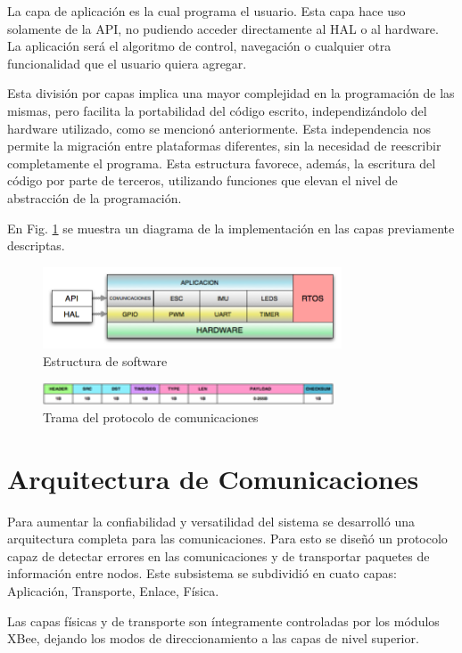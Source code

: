 \documentclass[a4paper, conference]{IEEEtran}
\begin{document}
La capa de aplicación es la cual programa el usuario. Esta capa hace uso solamente de la API, no pudiendo acceder directamente al HAL o al hardware. La aplicación será el algoritmo de control, navegación o cualquier otra funcionalidad que el usuario quiera agregar.

Esta división por capas implica una mayor complejidad en la programación de las mismas, pero facilita la portabilidad del código escrito, independizándolo del hardware utilizado, como se mencionó anteriormente. Esta independencia nos permite la migración entre plataformas diferentes, sin la necesidad de reescribir completamente el programa. Esta estructura favorece, además, la escritura del código por parte de terceros, utilizando funciones que elevan el nivel de abstracción de la programación.

En Fig. \ref{ref:soft} se muestra un diagrama de la implementación en las capas previamente descriptas.

\begin{figure}[!t]
\centering
\includegraphics[width=3.49in]{soft}
\caption{Estructura de software}
\label{ref:soft}
\end{figure}

\begin{figure}[!t]
\centering
\includegraphics[width=3.40in]{trama}
\caption{Trama del protocolo de comunicaciones}
\label{ref:trama}
\end{figure}

\section{Arquitectura de Comunicaciones}

Para aumentar la confiabilidad y versatilidad del sistema se desarrolló una arquitectura completa para las comunicaciones. Para esto se diseñó un protocolo capaz de detectar errores en las comunicaciones y de transportar paquetes de información entre nodos. Este subsistema se subdividió en cuato capas: Aplicación, Transporte, Enlace, Física.

Las capas físicas y de transporte son íntegramente controladas por los módulos XBee, dejando los modos de direccionamiento a las capas de nivel superior.
\end{document}
